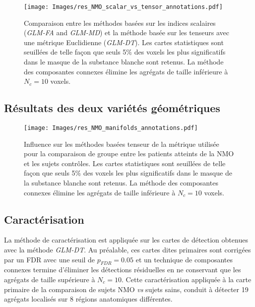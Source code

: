 \begin{figure*}[ht]
    \centering
    \texttt{[image: Images/res\_NMO\_scalar\_vs\_tensor\_annotations.pdf]}
    \caption{\label{fig:nmo_1} Comparaison entre les méthodes basées sur les indices scalaires (\textit{GLM-FA} and \textit{GLM-MD}) 
    et la méthode basée sur les tenseurs avec une métrique Euclidienne (\textit{GLM-DT}).
    Les cartes statistiques sont seuillées de telle façon que seuls 5\% des voxels les plus significatifs dans le masque de la substance blanche sont retenus.
    La méthode des composantes connexes élimine les agrégats de taille inférieure à $N_c=10$ voxels.}
\end{figure*}

\subsection{Résultats des deux variétés géométriques}


\begin{figure*}[ht]
    \centering
    \texttt{[image: Images/res\_NMO\_manifolds\_annotations.pdf]}
    \caption{\label{fig:nmo_2} Influence sur les méthodes basées tenseur de la métrique utilisée pour la comparaison de groupe entre les patients atteints de la NMO et les sujets contrôles.
    Les cartes statistiques sont seuillées de telle façon que seuls 5\% des voxels les plus significatifs dans le masque de la substance blanche sont retenus.
    La méthode des composantes connexes élimine les agrégats de taille inférieure à $N_c=10$ voxels.}
\end{figure*}


\subsection{Caractérisation}
La méthode de caractérisation est appliquée sur les cartes de détection obtenues avec la méthode \textit{GLM-DT}.
Au préalable, ces cartes dites \og primaires \fg sont corrigées par un FDR avec une seuil de $p_{FDR}=0.05$
et un technique de composantes connexes termine d'éliminer les détections résiduelles en ne conservant que les agrégats de taille supérieure à $N_c=10$.
Cette caractérisation appliquée à la carte primaire de la comparaison de sujets NMO \textit{vs} sujets sains, 
conduit à détecter 19 agrégats localisés sur 8 régions anatomiques différentes.

